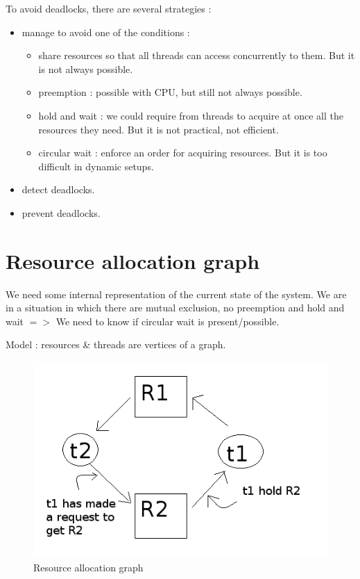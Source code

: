 \documentclass[a4paper,10pt]{article}
\begin{document}
To avoid deadlocks, there are several strategies :
\begin{itemize}
  \item manage to avoid one of the conditions :
  \begin{itemize}
    \item share resources so that all threads can access concurrently to them. But it is not always possible.
    \item preemption : possible with CPU, but still not always possible.
    \item hold and wait : we could require from threads to acquire at once all the resources they need. But it is not practical, not efficient.
    \item circular wait : enforce an order for acquiring resources. But it is too difficult in dynamic setups.
  \end{itemize}
  \item detect deadlocks.
  \item prevent deadlocks.
\end{itemize}

\section{Resource allocation graph}

We need some internal representation of the current state of the system. We are in a situation in which there are mutual exclusion, no preemption and hold and wait $=>$  We need to know if circular wait is present/possible.

Model : resources \& threads are vertices of a graph.
\begin{figure}[h]
  \begin{center}
    \includegraphics[scale =0.6]{resource_allocation_graph.png}
    \caption{Resource allocation graph}
  \end{center}
\end{figure}
\end{document}
